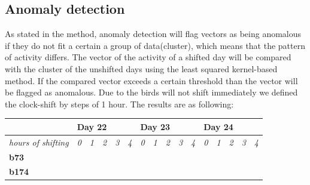 \documentclass[a4paper]{article}
\begin{document}
\subsection*{Anomaly detection}
As stated in the method, anomaly detection will flag vectors as being anomalous if they do not fit a certain a group of data(cluster), which means that the pattern of activity differs. The vector of the activity of a shifted day will be compared with the cluster of the unshifted days using the least squared kernel-based method. If the compared vector exceeds a certain threshold than the vector will be flagged as anomalous. Due to the birds will not shift immediately we defined the clock-shift by steps of 1 hour. The results are as following:\\
\begin{table}[H]
\centering
\label{my-label}
\begin{tabular}{llllllllllllllll}
\hline
\multicolumn{1}{|l|}{} & \multicolumn{5}{l|}{\textbf{Day 22}} & \multicolumn{5}{l|}{\textbf{Day 23}} & \multicolumn{5}{l|}{\textbf{Day 24}} \\ \hline
\multicolumn{1}{|l|}{\textit{hours of shifting}} & \multicolumn{1}{l|}{\textit{0}} & \multicolumn{1}{l|}{\textit{1}} & \multicolumn{1}{l|}{\textit{2}} & \multicolumn{1}{l|}{\textit{3}} & \multicolumn{1}{l|}{\textit{4}} & \multicolumn{1}{l|}{\textit{0}} & \multicolumn{1}{l|}{\textit{1}} & \multicolumn{1}{l|}{\textit{2}} & \multicolumn{1}{l|}{\textit{3}} & \multicolumn{1}{l|}{\textit{4}} & \multicolumn{1}{l|}{\textit{0}} & \multicolumn{1}{l|}{\textit{1}} & \multicolumn{1}{l|}{\textit{2}} & \multicolumn{1}{l|}{\textit{3}} & \multicolumn{1}{l|}{\textit{4}} \\ \hline
\multicolumn{1}{|l|}{\textbf{b73}} & \multicolumn{1}{l|}{\cellcolor[HTML]{4ECF94}} & \multicolumn{1}{l|}{\cellcolor[HTML]{4ECF94}} & \multicolumn{1}{l|}{\cellcolor[HTML]{EA6D67}} & \multicolumn{1}{l|}{\cellcolor[HTML]{EA6D67}} & \multicolumn{1}{l|}{\cellcolor[HTML]{4ECF94}} & \multicolumn{1}{l|}{\cellcolor[HTML]{4ECF94}} & \multicolumn{1}{l|}{\cellcolor[HTML]{4ECF94}} & \multicolumn{1}{l|}{\cellcolor[HTML]{4ECF94}} & \multicolumn{1}{l|}{\cellcolor[HTML]{4ECF94}} & \multicolumn{1}{l|}{\cellcolor[HTML]{4ECF94}} & \multicolumn{1}{l|}{\cellcolor[HTML]{EA6D67}} & \multicolumn{1}{l|}{\cellcolor[HTML]{EA6D67}} & \multicolumn{1}{l|}{\cellcolor[HTML]{EA6D67}} & \multicolumn{1}{l|}{\cellcolor[HTML]{EA6D67}} & \multicolumn{1}{l|}{\cellcolor[HTML]{EA6D67}} \\ \hline
\multicolumn{1}{|l|}{\textbf{b174}} & \multicolumn{1}{l|}{\cellcolor[HTML]{EA6D67}} & \multicolumn{1}{l|}{\cellcolor[HTML]{EA6D67}} & \multicolumn{1}{l|}{\cellcolor[HTML]{EA6D67}} & \multicolumn{1}{l|}{\cellcolor[HTML]{EA6D67}} & \multicolumn{1}{l|}{\cellcolor[HTML]{EA6D67}} & \multicolumn{1}{l|}{\cellcolor[HTML]{4ECF94}} & \multicolumn{1}{l|}{\cellcolor[HTML]{4ECF94}} & \multicolumn{1}{l|}{\cellcolor[HTML]{4ECF94}} & \multicolumn{1}{l|}{\cellcolor[HTML]{4ECF94}} & \multicolumn{1}{l|}{\cellcolor[HTML]{4ECF94}} & \multicolumn{1}{l|}{\cellcolor[HTML]{4ECF94}} & \multicolumn{1}{l|}{\cellcolor[HTML]{4ECF94}} & \multicolumn{1}{l|}{\cellcolor[HTML]{4ECF94}} & \multicolumn{1}{l|}{\cellcolor[HTML]{4ECF94}} & \multicolumn{1}{l|}{\cellcolor[HTML]{4ECF94}} \\ \hline

\end{tabular}
\end{table}
\end{document}
